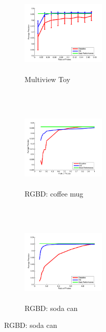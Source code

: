 \documentclass{article} %
\begin{document}
\begin{figure}
        \centering
        \begin{subfigure}[b]{0.3\textwidth}
                \centering
                \includegraphics[width=4cm,height=4cm]{fig/multiview.pdf}
                \caption{Multiview Toy}
                \label{curve:multiview}
        \end{subfigure}
        ~
        \begin{subfigure}[b]{0.3\textwidth}
                \centering
                \includegraphics[width=4cm,height=4cm]{fig/coffeemug1pure.pdf}
                \caption{RGBD: coffee mug}
                \label{curve:RGBDcoffeemug}
        \end{subfigure}
        ~
        \begin{subfigure}[b]{0.3\textwidth}
                \centering
                \includegraphics[width=4cm,height=4cm]{fig/sodacan1pure.pdf}
                \caption{RGBD: soda can}
                \label{curve:RGBDsodacan}
        \end{subfigure}


\end{figure}
\end{document}
